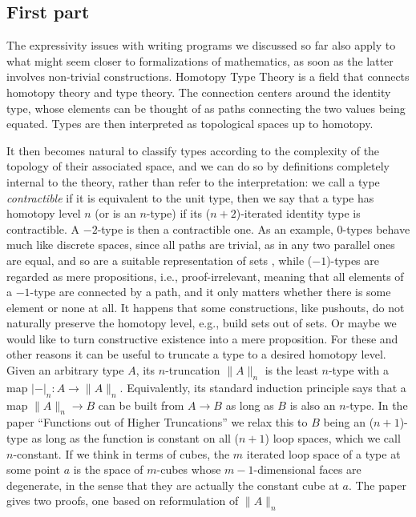 \documentclass{book}
\newcommand{\tr}[2]{\| #2 \|_{#1}}
\newcommand{\trcon}[2]{| #2 |_{#1}}
\begin{document}
\subsection{First part}
The expressivity issues with writing programs we discussed so far
also apply to
what might seem closer to formalizations of mathematics, as soon as the
latter involves non-trivial constructions.
Homotopy Type Theory \cite{hottbook} is a field that connects homotopy theory and type theory.
The connection centers around the identity type, whose elements can be
thought of as paths connecting the two values being equated. Types are
then interpreted as topological spaces up to homotopy.

It then becomes natural to classify types according to the complexity
of the topology of their associated space, and we can do so by
definitions completely internal to the theory, rather than refer to
the interpretation: we call a type \emph{contractible} if it is
equivalent to the unit type, then we say that a type has homotopy level $n$ (or is an
$n$-type) if its ($n{+}2$)-iterated identity type is contractible. A $-2$-type is then a contractible one.
As an example,
$0$-types behave much like discrete spaces, since all paths are
trivial, as in any two parallel ones are equal,
and so are a suitable representation of sets \cite{rijkeSpitters:mscs15},
while ($-1$)-types are regarded as mere propositions, i.e.,
proof-irrelevant, meaning that all elements of a $-1$-type are
  connected by a path, and it only matters whether there is some element or none
  at all.
It happens that some constructions, like pushouts, do not naturally
preserve the homotopy level, e.g., build sets out of sets.  Or maybe we
would like to turn constructive existence into a mere proposition.  For
these and other reasons it can be useful to truncate a type to a
desired homotopy level.
Given an arbitrary type $A$, its $n$-truncation $\tr{n}{A}$ is the least
$n$-type with a map $\trcon{n}{{-}} : A \to \tr{n}{A}$.  Equivalently, its standard
induction principle says that a map $\tr{n}{A} \to B$ can be built
from $A \to B$ as long as $B$ is also an $n$-type.
In the paper ``Functions out of Higher Truncations'' we relax this to
$B$ being an ($n{+}1$)-type as long as the function is constant on all
($n{+}1$) loop spaces, which we call $n$-constant.
If we think in terms of cubes, the $m$ iterated loop space of a type at some point $a$
is the space of $m$-cubes whose $m{-}1$-dimensional faces are
degenerate, in the sense that they are actually the constant cube at $a$.
The paper gives two proofs, one based on reformulation of $\tr{n}{A}$
\end{document}
